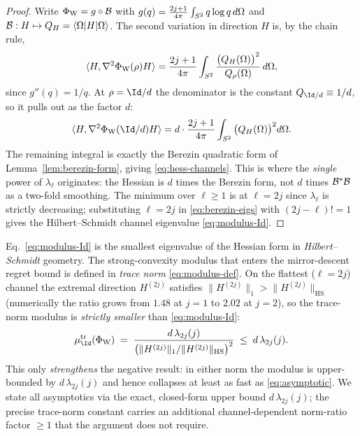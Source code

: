 \begin{proof}
Write $\Phi_{\mathrm W}=g\circ\mathcal{B}$ with
$g(q)=\frac{2j+1}{4\pi}\int_{S^{2}} q\log q\,d\Omega$ and
$\mathcal{B}:H\mapsto Q_H=\langle\Omega\rvert H\lvert\Omega\rangle$. The second
variation in direction $H$ is, by the chain rule,
\[
  \langle H,\nabla^{2}\Phi_{\mathrm W}(\rho)H\rangle
  =\frac{2j+1}{4\pi}\int_{S^{2}}\frac{\big(Q_H(\Omega)\big)^2}{Q_\rho(\Omega)}\,d\Omega ,
\]
since $g''(q)=1/q$. At $\rho=\Id/d$ the denominator is the constant
$Q_{\Id/d}\equiv 1/d$, so it pulls out as the factor $d$:
\[
  \langle H,\Hess\Phi_{\mathrm W}(\Id/d)H\rangle
  = d\cdot\frac{2j+1}{4\pi}\int_{\sphere}\big(Q_H(\Omega)\big)^2 d\Omega .
\]
The remaining integral is exactly the Berezin quadratic form of
Lemma~\ref{lem:berezin-form}, giving \eqref{eq:hess-channels}. This is where the
\emph{single} power of $\lambda_\ell$ originates: the Hessian is $d$ times the
Berezin form, not $d$ times $\mathcal{B}^{*}\mathcal{B}$ as a two-fold smoothing. The
minimum over $\ell\ge1$ is at $\ell=2j$ since $\lambda_\ell$ is strictly
decreasing; substituting $\ell=2j$ in \eqref{eq:berezin-eigs} with
$(2j-\ell)!=1$ gives the Hilbert--Schmidt channel eigenvalue
\eqref{eq:modulus-Id}.
\end{proof}

\begin{remark}
\label{rem:hs-vs-tn}
Eq.~\eqref{eq:modulus-Id} is the smallest eigenvalue of the Hessian form in
\emph{Hilbert--Schmidt} geometry. The strong-convexity modulus that enters the
mirror-descent regret bound is defined in \emph{trace norm}
\eqref{eq:modulus-def}. On the flattest ($\ell=2j$) channel the extremal
direction $H^{(2j)}$ satisfies $\lVert H^{(2j)}\rVert_1>\lVert
H^{(2j)}\rVert_{\mathrm{HS}}$ (numerically the ratio grows from $1.48$ at $j=1$
to $2.02$ at $j=2$), so the trace-norm modulus is \emph{strictly smaller} than
\eqref{eq:modulus-Id}:
\begin{equation}
  \mu_{\Id}^{\mathrm{tr}}(\Phi_{\mathrm W})
  \;=\;\frac{d\,\lambda_{2j}(j)}{\big(\lVert H^{(2j)}\rVert_1/\lVert H^{(2j)}\rVert_{\mathrm{HS}}\big)^2}
  \;\le\; d\,\lambda_{2j}(j).
  \label{eq:tn-modulus}
\end{equation}
This only \emph{strengthens} the negative result: in either norm the modulus is
upper-bounded by $d\,\lambda_{2j}(j)$ and hence collapses at least as fast as
\eqref{eq:asymptotic}. We state all asymptotics via the exact, closed-form
upper bound $d\,\lambda_{2j}(j)$; the precise trace-norm constant carries an
additional channel-dependent norm-ratio factor $\ge1$ that the argument does not
require.
\end{remark}

